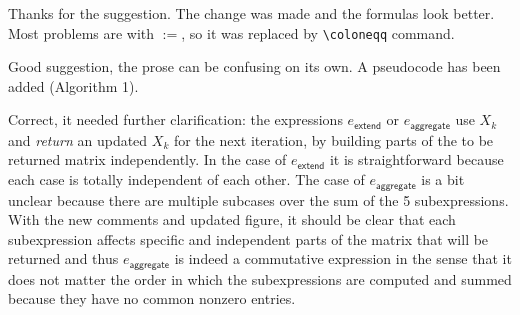 \bigskip

\begin{comment}
	And you should use \verb+\colon+ instead of $:$, because $:$ is treated as
	a division operator by Latex and thus the spacing is not correct.
\end{comment}

\answer Thanks for the suggestion. The change was made and the formulas look better.
Most problems are with $:=$, so it was replaced by \verb|\coloneqq| command.
\bigskip

\begin{comment}
	LU-Decomposition: You should definitely provide some pseudocode for the LU Decomposition
	algorithm in order to allow a simpler comparison with your MATLANG
	expressions. Right now the algorithm is given as prose. Furthermore it is not
	even complete as the definition of $c_i$ with $i \neq 1$ is missing.
\end{comment}

\answer Good suggestion, the prose can be confusing on its own. A pseudocode has been added (Algorithm 1).
\bigskip

\begin{comment}
	Algorithm 1: the aggregate function is working in a completely different way than your
	MATLANG construction. The MATLANG constructions is a sum over 5 expressions,
	which especially implies that the order of evaluation is irrelevant. However
	the algorithm is written in a way that the order of the statements is very
	important. Especially it is not the case that the five expressions correspond
	to five different cases of the algorithm as you claim.
	(\ldots)
	some constructions are way more complex than needed.
\end{comment}

\answer Correct, it needed further clarification: the expressions $e_{\mathsf{extend}}$ or $e_{\mathsf{aggregate}}$ use $X_k$ and \emph{return} an updated $X_k$ for the next iteration, by building parts of the to be returned matrix independently.
In the case of $e_{\mathsf{extend}}$ it is straightforward because each case is totally independent of each other.
The case of $e_{\mathsf{aggregate}}$ is a bit unclear because there are multiple subcases over the sum of the 5 subexpressions.
With the new comments and updated figure, it should be clear that each subexpression affects specific and independent parts of the matrix that will be returned and thus $e_{\mathsf{aggregate}}$ is indeed a commutative expression in the sense that it does not matter the order in which the subexpressions are computed and summed because they have no common nonzero entries.

